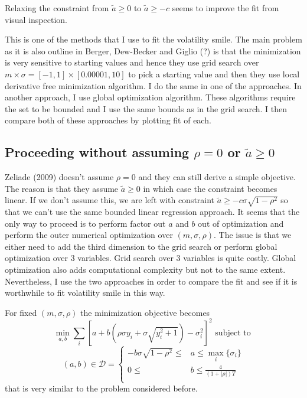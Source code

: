 \documentclass[12pt]{article}
\begin{document}
Relaxing the constraint from $\tilde{a} \ge 0$ to $\tilde{a} \ge -c$ seems to improve the fit from visual inspection.

This is one of the methods that I use to fit the volatility smile. The main problem as it is also outline in Berger, Dew-Becker and Giglio (?) is that the minimization is very sensitive to starting values and hence they use grid search over $m \times \sigma = [-1,1] \times [0.00001, 10]$ to pick a starting value and then they use local derivative free minimization algorithm. I do the same in one of the approaches. In another approach, I use global optimization algorithm. These algorithms require the set to be bounded and I use the same bounds as in the grid search. I then compare both of these approaches by plotting fit of each.

\subsection[alternative title goes here]{Proceeding without assuming $\rho = 0$ or $\tilde{a} \ge 0$}

Zeliade (2009) doesn't assume $\rho = 0$ and they can still derive a simple objective. The reason is that they assume $\tilde{a} \ge 0$ in which case the constraint becomes linear. If we don't assume this, we are left with constraint $\tilde{a} \ge -c\sigma\sqrt{1-\rho^2}$ so that we can't use the same bounded linear regression approach. It seems that the only way to proceed is to perform factor out $a$ and $b$ out of optimization and perform the outer numerical optimization over $(m, \sigma, \rho)$. The issue is that we either need to add the third dimension to the grid search or perform global optimization over 3 variables. Grid search over 3 variables is quite costly. Global optimization also adds computational complexity but not to the same extent. Nevertheless, I use the two approaches in order to compare the fit and see if it is worthwhile to fit volatility smile in this way.

For fixed $(m, \sigma, \rho)$ the minimization objective becomes
\[\min_{a, b} \sum_i \left[a + b\left(\rho \sigma y_i + \sigma\sqrt{y_i^2 + 1}\right) - \sigma_i^2\right]^2 \text{ subject to }\]
\[(a,b) \in \mathcal{D} = 
\left\{\begin{aligned}
	-b\sigma\sqrt{1-\rho^2} \le & a \le \max_i\{\sigma_i\} \\
	0 \le &b \le \frac{4}{(1+|\rho|)T} \\
\end{aligned}\right.\]
that is very similar to the problem considered before. 
\end{document}
